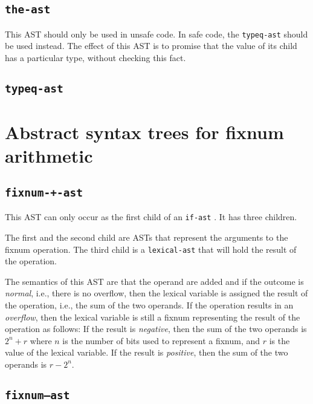 \subsection{\texttt{the-ast}}
\label{the-ast}

This AST should only be used in unsafe code.  In safe code, the
\texttt{typeq-ast}  should be used instead.  The
effect of this AST is to promise that the value of its child has a
particular type, without checking this fact. 

\subsection{\texttt{typeq-ast}}
\label{typeq-ast}

\section{Abstract syntax trees for fixnum arithmetic}

\subsection{\texttt{fixnum-+-ast}}
\label{fixnum-+-ast}

This AST can only occur as the first child of an \texttt{if-ast}
.  It has three children.

The first and the second child are ASTs that represent the arguments
to the fixnum operation.  The third child is a
\texttt{lexical-ast} that will hold the result of the operation.

The semantics of this AST are that the operand are added and if the
outcome is \emph{normal}, i.e., there is no overflow, then the lexical
variable is assigned the result of the operation, i.e., the sum of the
two operands.  If the operation results in an \emph{overflow}, then
the lexical variable is still a fixnum representing the result of the
operation as follows:  If the result is \emph{negative}, then the
sum of the two operands is $2^n + r$ where $n$ is the number of bits
used to represent a fixnum, and $r$ is the value of the lexical
variable.  If the result is \emph{positive}, then the sum of the two
operands is $r - 2^n$.

\subsection{\texttt{fixnum---ast}}
\label{fixnum---ast}

